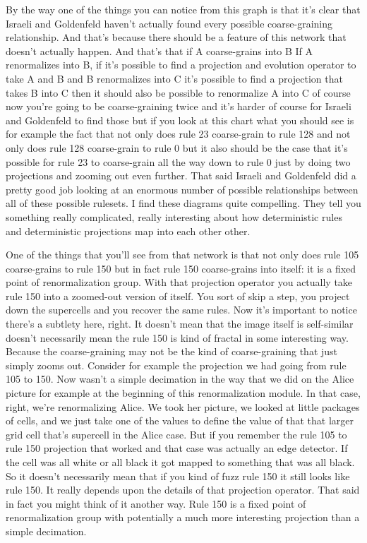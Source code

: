 \documentclass[]{article}
\begin{document}
By the way one of the things you can notice from this graph is that it's clear that
Israeli and Goldenfeld haven't actually found every possible coarse-graining relationship.
And that's because there should be a feature of this network that doesn't actually happen.
And that's that if A coarse-grains into B If A renormalizes into B, if it's possible to find a projection and evolution operator to take A and B and B renormalizes into C
it's possible to find a projection that takes B into C then it should also be possible to renormalize A into C of course now you're going to be coarse-graining twice and it's harder of course for Israeli and Goldenfeld to find those
but if you look at this chart what you should see is for example the fact that not only does rule 23 coarse-grain to rule 128 and not only does rule 128 coarse-grain to rule 0 but it also should be the case that it's possible for rule 23
to coarse-grain all the way down to rule 0 just by doing two projections and zooming out even further.
That said Israeli and Goldenfeld did a pretty good job looking at an enormous number of possible relationships between all of these possible rulesets. I find these diagrams quite compelling. They tell you something really complicated, really interesting about how deterministic rules and deterministic projections map into each other other.

One of the things that you'll see from that network is that not only does rule 105
coarse-grains to rule 150 but in fact rule 150 coarse-grains into itself:
it is a fixed point of renormalization group. With that projection operator you actually take rule 150 into a zoomed-out version of itself.
You sort of skip a step, you project down the supercells and you recover the same rules.
Now it's important to notice there's a subtlety here, right.
It doesn't mean that the image itself is self-similar doesn't necessarily mean the rule 150 is kind of fractal in some interesting way.
Because the coarse-graining may not be the kind of coarse-graining that just simply zooms out.
Consider for example the projection we had going from rule 105 to 150.
Now wasn't a simple decimation in the way that we did on the Alice picture for example at the beginning of this renormalization module.
In that case, right, we're renormalizing Alice.
We took her picture, we looked at little packages of cells, and we just take one of the values to define the value of that that larger grid cell that's supercell in the Alice case.
But if you remember the rule 105 to rule 150 projection that worked and that case
was actually an edge detector.
If the cell was all white or all black it got mapped to something that was all black.
So it doesn't necessarily mean that if you kind of fuzz rule 150 it still looks like rule 150.
It really depends upon the details of that projection operator.
That said in fact you might think of it another way.
Rule 150 is a fixed point of renormalization group with potentially a much more interesting projection than a simple decimation.
\end{document}
